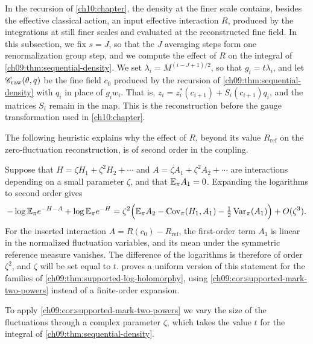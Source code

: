In the recursion of \cref{ch10:chapter}, the density at the finer scale contains, besides the effective classical action, an input effective interaction $R$, produced by the integrations at still finer scales and evaluated at the reconstructed fine field. In this subsection, we fix $s=J$, so that the $J$ averaging steps form one renormalization group step, and we compute the effect of $R$ on the integral of \cref{ch09:thm:sequential-density}. We set $\lambda_i=M^{(i-J+1)/2}$, so that $g_i=t\lambda_i$, and let $\mathscr C_{\mathrm{raw}}(\theta,q)$ be the fine field $c_0$ produced by the recursion of \cref{ch09:thm:sequential-density} with $q_i$ in place of $g_iw_i$. That is, $z_i=z_i^*(c_{i+1})+S_i(c_{i+1})q_i$, and the matrices $S_i$ remain in the map. This is the reconstruction before the gauge transformation used in \cref{ch10:chapter}.

The following heuristic explains why the effect of $R$, beyond its value $R_{\mathrm{ref}}$ on the zero-fluctuation reconstruction, is of second order in the coupling.

\begin{remark}\label{ch09:rem:second-order}
Suppose that $H=\zeta H_1+\zeta^2H_2+\cdots$ and $A=\zeta A_1+\zeta^2A_2+\cdots$ are interactions depending on a small parameter $\zeta$, and that $\mathbb E_\pi A_1=0$. Expanding the logarithms to second order gives
\[
 -\log\mathbb E_\pi e^{-H-A}+\log\mathbb E_\pi e^{-H}=\zeta^2\Bigl(\mathbb E_\pi A_2-\operatorname{Cov}_\pi(H_1,A_1)-\tfrac12\operatorname{Var}_\pi(A_1)\Bigr)+O(\zeta^3).
\]
For the inserted interaction $A=R(c_0)-R_{\mathrm{ref}}$, the first-order term $A_1$ is linear in the normalized fluctuation variables, and its mean under the symmetric reference measure vanishes. The difference of the logarithms is therefore of order $\zeta^2$, and $\zeta$ will be set equal to $t$.  proves a uniform version of this statement for the families of \cref{ch09:thm:supported-log-holomorphy}, using \cref{ch09:cor:supported-mark-two-powers} instead of a finite-order expansion.
\end{remark}

To apply \cref{ch09:cor:supported-mark-two-powers} we vary the size of the fluctuations through a complex parameter $\zeta$, which takes the value $t$ for the integral of \cref{ch09:thm:sequential-density}.

